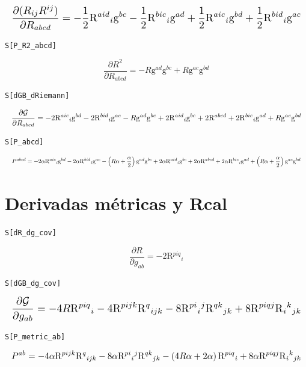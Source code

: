 \documentclass[11pt,a4paper]{article}
\begin{document}
\[
\resizebox{\textwidth}{!}{$\displaystyle \dfrac{\partial (R_{ij}R^{ij})}{\partial R_{abcd}} = -\frac{1}{2}\mathrm{R}{}^{aid}{}_{i}\mathrm{g}{}^{bc} - \frac{1}{2}\mathrm{R}{}^{bic}{}_{i}\mathrm{g}{}^{ad} + \frac{1}{2}\mathrm{R}{}^{aic}{}_{i}\mathrm{g}{}^{bd} + \frac{1}{2}\mathrm{R}{}^{bid}{}_{i}\mathrm{g}{}^{ac}$}
\]


\noindent\texttt{S[P\_R2\_abcd]}

\[
\boxed{\dfrac{\partial R^2}{\partial R_{abcd}} = -R\mathrm{g}{}^{ad}\mathrm{g}{}^{bc} + R\mathrm{g}{}^{ac}\mathrm{g}{}^{bd}}
\]


\noindent\texttt{S[dGB\_dRiemann]}

\[
\resizebox{\textwidth}{!}{$\displaystyle \dfrac{\partial \mathcal G}{\partial R_{abcd}} = -2\mathrm{R}{}^{aic}{}_{i}\mathrm{g}{}^{bd} - 2\mathrm{R}{}^{bid}{}_{i}\mathrm{g}{}^{ac} - R\mathrm{g}{}^{ad}\mathrm{g}{}^{bc} + 2\mathrm{R}{}^{aid}{}_{i}\mathrm{g}{}^{bc} + 2\mathrm{R}{}^{abcd} + 2\mathrm{R}{}^{bic}{}_{i}\mathrm{g}{}^{ad} + R\mathrm{g}{}^{ac}\mathrm{g}{}^{bd}$}
\]


\noindent\texttt{S[P\_abcd]}

\[
\resizebox{\textwidth}{!}{$\displaystyle P^{abcd} = -2\alpha\mathrm{R}{}^{aic}{}_{i}\mathrm{g}{}^{bd} - 2\alpha\mathrm{R}{}^{bid}{}_{i}\mathrm{g}{}^{ac} - \left(R \alpha + \frac{\alpha}{2}\right)\mathrm{g}{}^{ad}\mathrm{g}{}^{bc} + 2\alpha\mathrm{R}{}^{aid}{}_{i}\mathrm{g}{}^{bc} + 2\alpha\mathrm{R}{}^{abcd} + 2\alpha\mathrm{R}{}^{bic}{}_{i}\mathrm{g}{}^{ad} + \left(R \alpha + \frac{\alpha}{2}\right)\mathrm{g}{}^{ac}\mathrm{g}{}^{bd}$}
\]


\section*{Derivadas métricas y Rcal}

\noindent\texttt{S[dR\_dg\_cov]}

\[
\boxed{\dfrac{\partial R}{\partial g_{ab}} = -2\mathrm{R}{}^{piq}{}_{i}}
\]


\noindent\texttt{S[dGB\_dg\_cov]}

\[
\resizebox{\textwidth}{!}{$\displaystyle \dfrac{\partial \mathcal G}{\partial g_{ab}} = -4R\mathrm{R}{}^{piq}{}_{i} - 4\mathrm{R}{}^{pijk}\mathrm{R}{}^{q}{}_{ijk} - 8\mathrm{R}{}^{pi}{}_{i}{}^{j}\mathrm{R}{}^{qk}{}_{jk} + 8\mathrm{R}{}^{piqj}\mathrm{R}{}_{i}{}^{k}{}_{jk}$}
\]


\noindent\texttt{S[P\_metric\_ab]}

\[
\resizebox{\textwidth}{!}{$\displaystyle P^{ab} = -4\alpha\mathrm{R}{}^{pijk}\mathrm{R}{}^{q}{}_{ijk} - 8\alpha\mathrm{R}{}^{pi}{}_{i}{}^{j}\mathrm{R}{}^{qk}{}_{jk} - \left(4 R \alpha + 2 \alpha\right)\mathrm{R}{}^{piq}{}_{i} + 8\alpha\mathrm{R}{}^{piqj}\mathrm{R}{}_{i}{}^{k}{}_{jk}$}
\]
\end{document}
